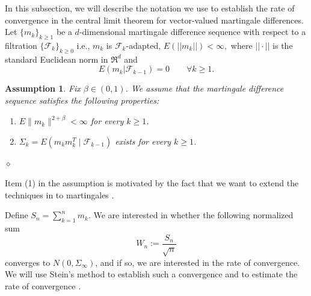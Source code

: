 \documentclass[10pt,a4paper]{article}
\newtheorem{assumption}{Assumption}
\begin{document}
In this subsection, we will describe the notation we use to establish the rate of convergence in the central limit theorem for vector-valued martingale differences. Let $\{m_k\}_{k\geq 1}$ be a $d$-dimensional martingale difference sequence with respect to a filtration $\{\mathcal{F}_k\}_{k\geq 0}$ i.e., $m_k$ is $\mathcal{F}_k$-adapted, $E(||m_k||)<\infty,$ where $||\cdot||$ is the standard Euclidean norm in $\Re^d$ and $$E(m_k|\mathcal{F}_{k-1})=0\qquad \forall k\geq 1.$$ 
\begin{assumption}\label{assume: martingale}
Fix $\beta\in(0,1)$. We assume that the martingale difference sequence satisfies the following properties:
\begin{enumerate}\label{assume}
\item $E\|m_k\|^{2+\beta}<\infty$ for every $k\geq 1$.
\item $\Sigma_k=E(m_km_k^T\mid\mathcal{F}_{k-1})$ exists for every $k\geq 1$.
\end{enumerate}
\hfill $\diamond$
\end{assumption}
Item (1) in the assumption is motivated by the fact that we want to extend the techniques in \citep{gallouet2018regularity} to martingales .

Define
$S_n=\sum_{k=1}^n m_k.$ We are interested in whether the following normalized sum 
\begin{equation}\label{eq: normalized sum}
W_n:=\frac{S_n}{\sqrt{n}}
\end{equation}
converges to $N(0,\Sigma_\infty)$, and if so, we are interested in the rate of convergence. We will use Stein's method to establish such a convergence and to estimate the rate of convergence \citep{stein1972bound,ross2011fundamentals,chatterjee2014short}. 
\end{document}
